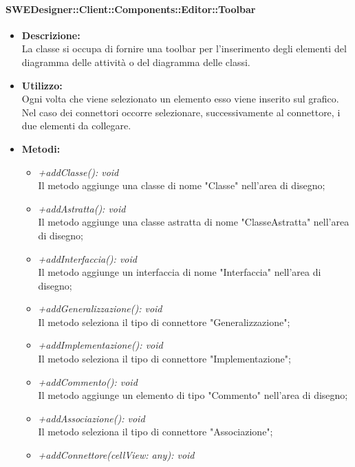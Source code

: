 			\paragraph{SWEDesigner::Client::Components::Editor::Toolbar}
				\begin{itemize}
          			\item \textbf{Descrizione:}\\
          			La classe si occupa di fornire una toolbar per l'inserimento degli elementi del diagramma delle attività o del diagramma delle classi.
          			\item \textbf{Utilizzo:}\\
          			Ogni volta che viene selezionato un elemento esso viene inserito sul grafico. Nel caso dei connettori occorre selezionare, successivamente al connettore, i due elementi da collegare.
          			\item \textbf{Metodi:}\\
          			\begin{itemize}
          				\item \emph{+addClasse(): void}\\
          				Il metodo aggiunge una classe di nome "Classe" nell'area di disegno;
          				\item \emph{+addAstratta(): void}\\
          				Il metodo aggiunge una classe astratta di nome "ClasseAstratta" nell'area di disegno;
          				\item \emph{+addInterfaccia(): void}\\
          				Il metodo aggiunge un interfaccia di nome "Interfaccia" nell'area di disegno;
          				\item \emph{+addGeneralizzazione(): void}\\
          				Il metodo seleziona il tipo di connettore "Generalizzazione";
          				\item \emph{+addImplementazione(): void}\\
          				Il metodo seleziona il tipo di connettore "Implementazione";
          				\item \emph{+addCommento(): void}\\
          				Il metodo aggiunge un elemento di tipo "Commento" nell'area di disegno;
          				\item \emph{+addAssociazione(): void}\\
          				Il metodo seleziona il tipo di connettore "Associazione";
          				\item \emph{+addConnettore(cellView: any): void}\\

\end{itemize}
\end{itemize}
